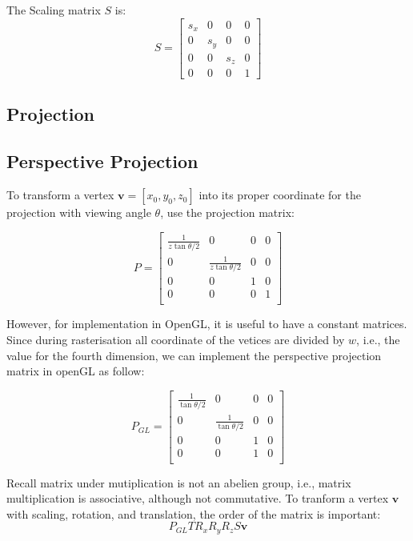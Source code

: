 \documentclass[12pt, a4paper]{article}
\theoremstyle{definition}
\theoremstyle{remark}
\begin{document}
The Scaling matrix $S$ is:
\begin{equation}\label{eq:scaling}
	S = 
	\begin{bmatrix}
	s_x & 0 & 0 & 0\\
	0 & s_y & 0 & 0\\
	0 & 0 & s_z & 0\\
	0 & 0 & 0 & 1
	\end{bmatrix}
\end{equation}

\subsection{Projection}
\subsection{Perspective Projection}
To transform a vertex $\bm{v}=[x_0, y_0, z_0]$ into its proper coordinate for the projection with viewing angle $\theta$, use the projection matrix:

\begin{equation}
	P=
	\begin{bmatrix}
	\frac{1}{z\tan{\theta/2}} & 0 & 0 & 0 \\
	0 & \frac{1}{z\tan{\theta/2}} & 0 & 0 \\
	0 & 0 & 1 & 0 \\
	0 & 0 & 0 & 1 \\
	\end{bmatrix}
\end{equation}

However, for implementation in OpenGL, it is useful to have a constant matrices. Since during rasterisation all coordinate of the vetices are divided by $w$, i.e., the value for the fourth dimension, we can implement the perspective projection matrix in openGL as follow:

\begin{equation}
	P_{GL}=
	\begin{bmatrix}
	\frac{1}{\tan{\theta/2}} & 0 & 0 & 0 \\
	0 & \frac{1}{\tan{\theta/2}} & 0 & 0 \\
	0 & 0 & 1 & 0 \\
	0 & 0 & 1 & 0 \\
	\end{bmatrix}
\end{equation}


Recall matrix under mutiplication is not an abelien group, i.e., matrix multiplication is associative, although not commutative.
To tranform a vertex $\bm{v}$ with scaling, rotation, and translation, the order of the matrix is important:
\begin{equation}\label{eq:combinedTransformation}
	P_{GL}TR_xR_yR_zS\bm{v}
\end{equation}
\end{document}
